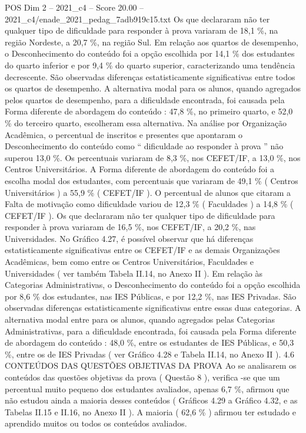 \begin{textsample}{POS Dim 2 – 2021\_c4 – Score 20.00 – 2021\_c4/enade\_2021\_pedag\_7adb919c15.txt}
Os que declararam não ter qualquer tipo de dificuldade para responder à prova variaram de 18,1 \%, na região Nordeste, a 20,7 \%, na região Sul.
Em relação aos quartos de desempenho, o Desconhecimento do conteúdo foi a opção escolhida por 14,1 \% dos estudantes do quarto inferior e por 9,4 \% do quarto superior, caracterizando uma tendência decrescente.
São observadas diferenças estatisticamente significativas entre todos os quartos de desempenho.
A alternativa modal para os alunos, quando agregados pelos quartos de desempenho, para a dificuldade encontrada, foi causada pela Forma diferente de abordagem do conteúdo : 47,8 \%, no primeiro quarto, e 52,0 \% do terceiro quarto, escolheram essa alternativa.
Na análise por Organização Acadêmica, o percentual de inscritos e presentes que apontaram o Desconhecimento do conteúdo como “ dificuldade ao responder à prova ” não superou 13,0 \%.
Os percentuais variaram de 8,3 \%, nos CEFET/IF, a 13,0 \%, nos Centros Universitários.
A Forma diferente de abordagem do conteúdo foi a escolha modal dos estudantes, com percentuais que variaram de 49,1 \% ( Centros Universitários ) a 55,9 \% ( CEFET/IF ).
O percentual de alunos que citaram a Falta de motivação como dificuldade variou de 12,3 \% ( Faculdades ) a 14,8 \% ( CEFET/IF ).
Os que declararam não ter qualquer tipo de dificuldade para responder à prova variaram de 16,5 \%, nos CEFET/IF, a 20,2 \%, nas Universidades.
No Gráfico 4.27, é possível observar que há diferenças estatisticamente significativas entre os CEFET/IF e as demais Organizações Acadêmicas, bem como entre os Centros Universitários, Faculdades e Universidades ( ver também Tabela II.14, no Anexo II ).
Em relação às Categorias Administrativas, o Desconhecimento do conteúdo foi a opção escolhida por 8,6 \% dos estudantes, nas IES Públicas, e por 12,2 \%, nas IES Privadas.
São observadas diferenças estatisticamente significativas entre essas duas categorias.
A alternativa modal entre para os alunos, quando agregados pelas Categorias Administrativas, para a dificuldade encontrada, foi causada pela Forma diferente de abordagem do conteúdo : 48,0 \%, entre os estudantes de IES Públicas, e 50,3 \%, entre os de IES Privadas ( ver Gráfico 4.28 e Tabela II.14, no Anexo II ). 4.6 CONTEÚDOS DAS QUESTÕES OBJETIVAS DA PROVA Ao se analisarem os conteúdos das questões objetivas da prova ( Questão 8 ), verifica -se que um percentual muito pequeno dos estudantes avaliados, apenas 6,7 \%, afirmou que não estudou ainda a maioria desses conteúdos ( Gráficos 4.29 a Gráfico 4.32, e as Tabelas II.15 e II.16, no Anexo II ).
A maioria ( 62,6 \% ) afirmou ter estudado e aprendido muitos ou todos os conteúdos avaliados.

\end{textsample}
